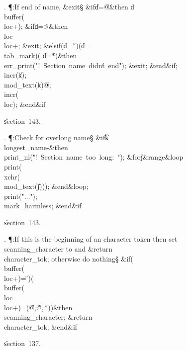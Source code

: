 . \P\?:If end of name, \&{exit}\X\S\?\6
\&{if}\1\1\8\|d\?=\?\H{@}\2\8\&{then}\6
\|d\?\K\?\\{buffer}\?\1(\?\\{loc}\?+\?\2)\?;\6
\&{if}\1\1\8\|d\?=\?\H{>}\2\8\&{then}\6
\\{loc}\?\K\?\\{loc}\?+;\5
\&{exit};\6
\4\&{elsif}\1\?\8\1(\?\|d\?=\?\H{\ }\?\2)\V\1(\?\|d\?=\?\\{tab\_mark}\?\2)\V\1(%
\?\|d\?=\?\H{*}\?\2)\?\2\8\&{then}\6
\\{err\_print}\?\1(\?\.{"!\ Section\ name\ didn\'t\ end"}\?\2)\?;\6
\&{exit};\2\6
\&{end}\8\2\&{if}\1;\6
\\{incr}\?\1(\?\|k\?\2)\?;\5
\\{mod\_text}\?\1(\?\|k\?\2)\K\?\H{@};\5
\\{incr}\?\1(\?\\{loc}\?\2)\?;%
\2\6
\&{end}\8\2\&{if}\1\par
\U section~143.\fi

. \P\?:Check for overlong name\X\S\?\6
\&{if}\1\1\8\|k\?\G\?\\{longest\_name}\?-\2\8\&{then}\6
\\{print\_nl}\?\1(\?\.{"!\ Section\ name\ too\ long:\ "}\?\2)\?;\6
\1\&{for}\8\|j\?\in\?\8\&{range}\?\to{}\8\&{loop}\6
\\{print}\?\1(\?\\{xchr}\?\1(\?\\{mod\_text}\?\1(\?\|j\?\2)\2)\2)\?;\2\6
\&{end}\8\&{loop};\6
\\{print}\?\1(\?\.{"..."}\?\2)\?;\5
\\{mark\_harmless};\2\6
\&{end}\8\2\&{if}\1\par
\U section~143.\fi

. \P\?:If this is the beginning of an character token then set %
\\{scanning\_character} to  and \?\&{return}\?\8\\{character\_tok};
otherwise do nothing\X\S\?\6
\&{if}\1\1\?\8\1(\?\\{buffer}\?\1(\?\\{loc}\?+\?\2)=\?\H{\'}\?\2)\ORE\1(\?%
\\{buffer}\?\1(\?\\{loc}\?\to\?\\{loc}\?+\?\2)=\1(\?\H{@}\?,\?\H{@}\?,%
\?\H{\'}\?\2)\2)\?\2\8\&{then}\6
\\{scanning\_character}\?\K\?;\5
\?\&{return}\?\8\\{character\_tok};\2\6
\&{end}\8\2\&{if}\1\par
\U section~137.\fi

